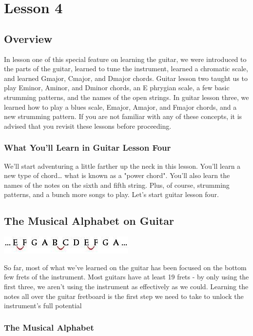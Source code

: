 \chapter{Lesson 4}
\section{Overview}
In lesson one of this special feature on learning the guitar, we were
introduced to the parts of the guitar, learned to tune the instrument, learned
a chromatic scale, and learned Gmajor, Cmajor, and Dmajor chords. Guitar lesson
two taught us to play Eminor, Aminor, and Dminor chords, an E phrygian scale, a
few basic strumming patterns, and the names of the open strings. In guitar
lesson three, we learned how to play a blues scale, Emajor, Amajor, and Fmajor
chords, and a new strumming pattern. If you are not familiar with any of these
concepts, it is advised that you revisit these lessons before proceeding.

\subsection{What You'll Learn in Guitar Lesson Four}

We'll start adventuring a little farther up the neck in this lesson. You'll
learn a new type of chord\ldots{} what is known as a "power chord". You'll also
learn the names of the notes on the sixth and fifth string. Plus, of course,
strumming patterns, and a bunch more songs to play. Let's start guitar lesson
four.

\section{The Musical Alphabet on Guitar}
\includegraphics{partfour/musalph.jpg}

So far, most of what we've learned on the guitar has been focused on the bottom
few frets of the instrument. Most guitars have at least 19 frets - by only
using the first three, we aren't using the instrument as effectively as we
could. Learning the notes all over the guitar fretboard is the first step we
need to take to unlock the instrument's full potential

\subsection{The Musical Alphabet}

